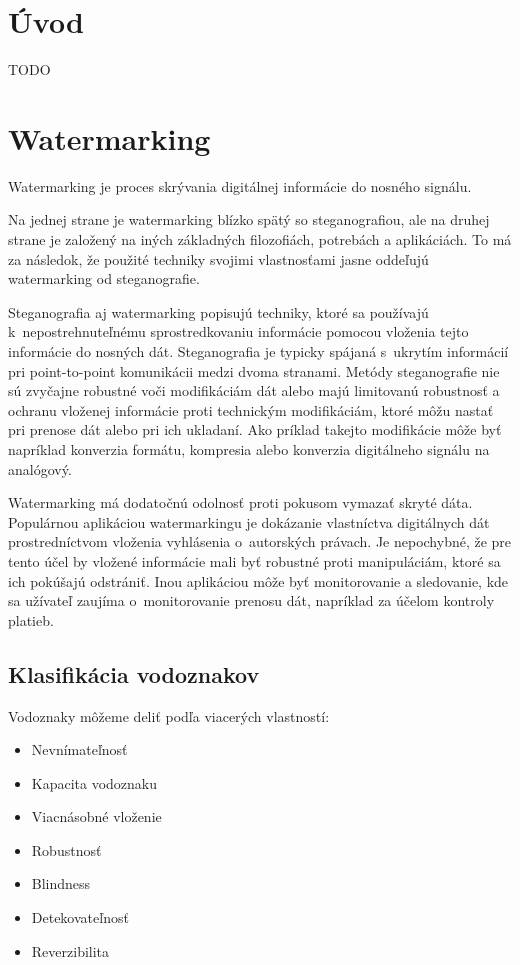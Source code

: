 \chapter{Úvod}
TODO

\chapter{Watermarking}
Watermarking je proces skrývania digitálnej informácie do nosného signálu.

Na jednej strane je watermarking blízko spätý so steganografiou, ale na druhej strane je založený na iných základných filozofiách, potrebách a aplikáciách. To má za následok, že použité techniky svojimi vlastnosťami jasne oddeľujú watermarking od steganografie.

Steganografia aj watermarking popisujú techniky, ktoré sa používajú k~nepostrehnuteľnému sprostredkovaniu informácie pomocou vloženia tejto informácie do nosných dát. Steganografia je typicky spájaná s~ukrytím informácií pri point-to-point komunikácii medzi dvoma stranami. Metódy steganografie nie sú zvyčajne robustné voči modifikáciám dát alebo majú limitovanú robustnosť a ochranu vloženej informácie proti technickým modifikáciám, ktoré môžu nastať pri prenose dát alebo pri ich ukladaní. Ako príklad takejto modifikácie môže byť napríklad konverzia formátu, kompresia alebo konverzia digitálneho signálu na analógový.

Watermarking má dodatočnú odolnosť proti pokusom vymazať skryté dáta. Populárnou aplikáciou watermarkingu je dokázanie vlastníctva digitálnych dát prostredníctvom vloženia vyhlásenia o~autorských právach. Je nepochybné, že pre tento účel by vložené informácie mali byť  robustné proti manipuláciám, ktoré sa ich pokúšajú odstrániť. Inou aplikáciou môže byť monitorovanie a sledovanie, kde sa užívateľ zaujíma o~monitorovanie prenosu dát, napríklad za účelom kontroly platieb. \cite{Katzenbeisser}

\section{Klasifikácia vodoznakov}
Vodoznaky môžeme deliť podľa viacerých vlastností:
\begin{itemize}
\item Nevnímateľnosť
\item Kapacita vodoznaku
\item Viacnásobné vloženie
\item Robustnosť
\item Blindness
\item Detekovateľnosť
\item Reverzibilita
\end{itemize}

